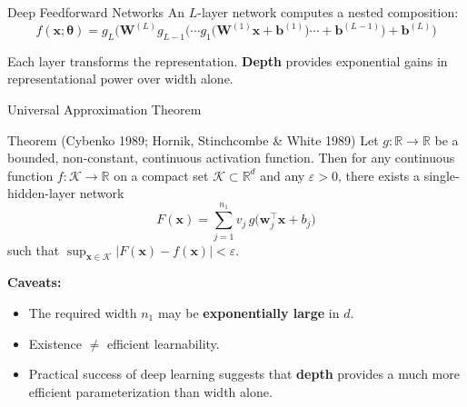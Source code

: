 \documentclass[aspectratio=169,11pt]{beamer}
\newcommand{\x}{\bm{x}}
\newcommand{\w}{\bm{w}}
\newcommand{\bb}{\bm{b}}
\newcommand{\W}{\bm{W}}
\newcommand{\R}{\mathbb{R}}
\begin{document}
\begin{frame}[shrink=8]{Deep Feedforward Networks}
\vspace{0.1cm}
An $L$-layer network computes a nested composition:
\[
    \boxed{f(\x;\bm{\theta}) = g_L\!\Big(\W^{(L)} g_{L-1}\!\big(\cdots g_1\!\big(\W^{(1)}\x + \bb^{(1)}\big)\cdots + \bb^{(L-1)}\big) + \bb^{(L)}\Big)}
\]

{\small Each layer transforms the representation.  \textbf{Depth} provides exponential gains in representational power over width alone.}
\end{frame}

\begin{frame}{Universal Approximation Theorem}
\small
\begin{block}{Theorem (Cybenko 1989; Hornik, Stinchcombe \& White 1989)}
Let $g:\R\to\R$ be a bounded, non-constant, continuous activation function.  Then for any continuous function $f:\mathcal{K}\to\R$ on a compact set $\mathcal{K}\subset\R^d$ and any $\varepsilon>0$, there exists a single-hidden-layer network
\[
    F(\x) = \sum_{j=1}^{n_1} v_j\, g\!\big(\w_j^\top\x + b_j\big)
\]
such that $\sup_{\x\in\mathcal{K}} |F(\x) - f(\x)| < \varepsilon$.
\end{block}

\vspace{0.25cm}
\textbf{Caveats:}
\begin{itemize}\itemsep0pt
    \item The required width $n_1$ may be \textbf{exponentially large} in $d$.
    \item Existence $\neq$ efficient learnability.
    \item Practical success of deep learning suggests that \textbf{depth} provides a much more efficient parameterization than width alone.
\end{itemize}
\end{frame}
\end{document}
